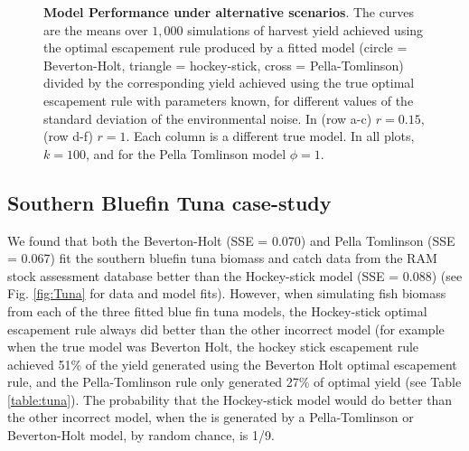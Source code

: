 \documentclass[]{elsarticle} %
\begin{document}
\begin{figure}[!htbp]
\begin{subfigure}[t]{0.3\textwidth}
	\end{subfigure}
	\caption{\textbf{Model Performance under alternative scenarios}. The curves are the means over $1,000$ simulations of harvest yield achieved using the optimal escapement rule produced by a fitted model (circle = Beverton-Holt, triangle = hockey-stick, cross = Pella-Tomlinson) divided by the corresponding yield achieved using the true optimal escapement rule with parameters known, for different values of the standard deviation of the environmental noise. In (row a-c) $r=0.15$, (row d-f) $r=1$. Each column is a different true model. In all plots, $k=100$, and for the Pella Tomlinson model $\phi = 1$.}\label{fig:ModelPerfVSig}
\end{figure}


\subsection{Southern Bluefin Tuna case-study}
We found that both the Beverton-Holt (SSE = 0.070) and Pella Tomlinson (SSE = 0.067) fit the southern bluefin tuna biomass and catch data from the RAM stock assessment database better than the Hockey-stick model (SSE = 0.088) (see Fig. \ref{fig:Tuna} for data and model fits). However, when simulating fish biomass from each of the three fitted blue fin tuna models, the Hockey-stick optimal escapement rule always did better than the other incorrect model (for example when the true model was Beverton Holt, the hockey stick escapement rule achieved 51\% of the yield generated using the Beverton Holt optimal escapement rule, and the Pella-Tomlinson rule only generated 27\% of optimal yield (see Table \ref{table:tuna}). The probability that the Hockey-stick model would do better than the other incorrect model, when the is generated by a Pella-Tomlinson or Beverton-Holt model, by random chance, is 1/9.
\end{document}
